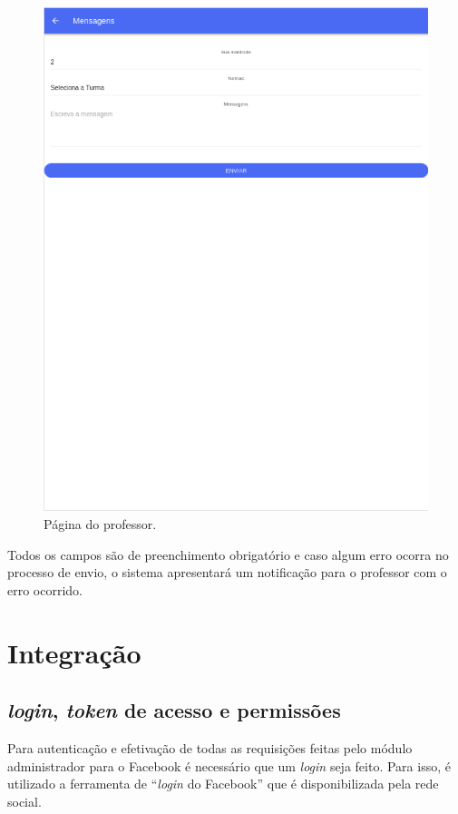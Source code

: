 \begin{figure}[H]
\centering
\includegraphics[scale=0.5]{figuras/mobile2}
\caption{Página do professor.}
\label{fig:mobile3}
\end{figure}

Todos os campos são de preenchimento obrigatório e caso algum erro ocorra no processo de envio, o sistema apresentará um notificação para o professor com o erro ocorrido.

\section{Integração}
\subsection{\textit{login}, \textit{token} de acesso e permissões}
Para autenticação e efetivação de todas as requisições feitas pelo módulo administrador para o Facebook é necessário que um \textit{login} seja feito. Para isso, é utilizado a ferramenta de ``\textit{login} do Facebook''  que é disponibilizada pela rede social.

